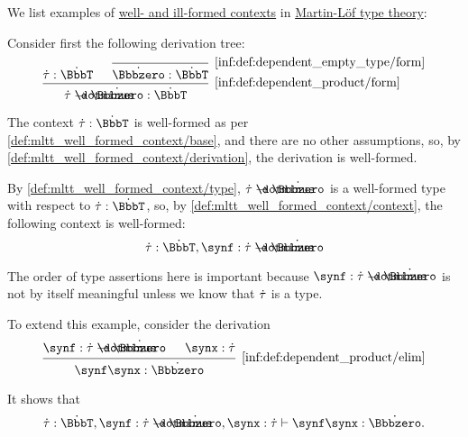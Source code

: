 \begin{example}\label{ex:def:mltt_well_formed_context}
  We list examples of \hyperref[def:mltt_well_formed_context]{well- and ill-formed contexts} in \hyperref[def:mltt]{Martin-L\"of type theory}:

  \begin{thmenum}
     Consider first the following derivation tree:
    \begin{equation*}
      \begin{prooftree}
        \hypo{ \syn\tau: \syn\BbbT }
        \infer0[\ref{inf:def:dependent_empty_type/form}]{ \syn\Bbbzero: \syn\BbbT }
        \infer2[\ref{inf:def:dependent_product/form}]{ \syn\tau \synimplies \syn\Bbbzero: \syn\BbbT }
      \end{prooftree}
    \end{equation*}

    The context \( \syn\tau: \syn\BbbT \) is well-formed as per \cref{def:mltt_well_formed_context/base}, and there are no other assumptions, so, by \cref{def:mltt_well_formed_context/derivation}, the derivation is well-formed.

    By \cref{def:mltt_well_formed_context/type}, \( \syn\tau \synimplies \syn\Bbbzero \) is a well-formed type with respect to \( \syn\tau: \syn\BbbT \), so, by \cref{def:mltt_well_formed_context/context}, the following context is well-formed:
    \begin{equation*}
      \syn\tau: \syn\BbbT, \synf: \syn\tau \synimplies \syn\Bbbzero
    \end{equation*}

    The order of type assertions here is important because \( \synf: \syn\tau \synimplies \syn\Bbbzero \) is not by itself meaningful unless we know that \( \dot{\tau} \) is a type.

    To extend this example, consider the derivation
    \begin{equation*}
      \begin{prooftree}
        \hypo{ \synf: \syn\tau \synimplies \syn\Bbbzero }
        \hypo{ \synx: \syn\tau }
        \infer2[\ref{inf:def:dependent_product/elim}]{ \synf \synx: \syn\Bbbzero }
      \end{prooftree}
    \end{equation*}

    It shows that
    \begin{equation*}
      \syn\tau: \syn\BbbT, \synf: \syn\tau \synimplies \syn\Bbbzero, \synx: \syn\tau \vdash \synf \synx: \syn\Bbbzero.
    \end{equation*}


\end{thmenum}
\end{example}
